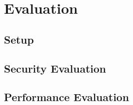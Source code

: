 \section{Evaluation}
\subsection{Setup}
\subsection{Security Evaluation}
\subsection{Performance Evaluation}
